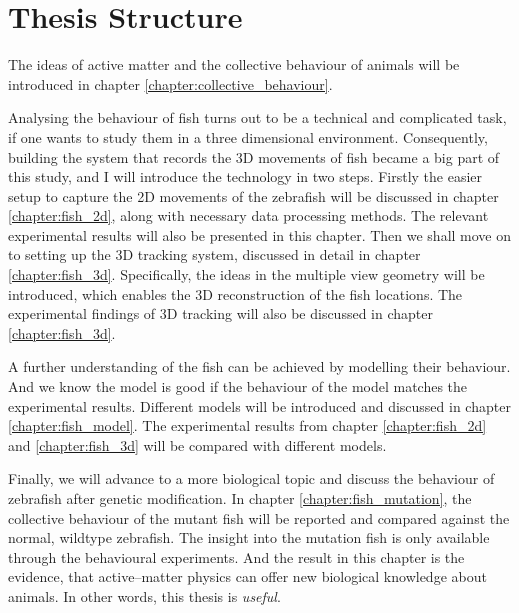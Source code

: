\documentclass[11pt,twoside]{report}
\begin{document}
\section{Thesis Structure}

The ideas of active matter and the collective behaviour of animals will be introduced in chapter \ref{chapter:collective_behaviour}.


Analysing the behaviour of fish turns out to be a technical and complicated task, if one wants to study them in a three dimensional environment. Consequently, building the system that records the 3D movements of fish became a big part of this study, and I will introduce the technology in two steps. Firstly the easier setup to capture the 2D movements of the zebrafish will be discussed in chapter \ref{chapter:fish_2d}, along with necessary data processing methods. The relevant experimental results will also be presented in this chapter. Then we shall move on to setting up the 3D tracking system, discussed in detail in chapter \ref{chapter:fish_3d}. Specifically, the ideas in the multiple view geometry will be introduced, which enables the 3D reconstruction of the fish locations. The experimental findings of 3D tracking will also be discussed in chapter \ref{chapter:fish_3d}.

A further understanding of the fish can be achieved by modelling their behaviour. And we know the model is good if the behaviour of the model matches the experimental results. Different models will be introduced and discussed in chapter \ref{chapter:fish_model}. The experimental results from chapter \ref{chapter:fish_2d} and \ref{chapter:fish_3d} will be compared with different models.

Finally, we will advance to a more biological topic and discuss the behaviour of zebrafish after genetic modification. In chapter \ref{chapter:fish_mutation}, the collective behaviour of the mutant fish will be reported and compared against the normal, wildtype zebrafish. The insight into the mutation fish is only available through the behavioural experiments. And the result in this chapter is the evidence, that active--matter physics can offer new biological knowledge about animals. In other words, this thesis is \emph{useful}.
\end{document}
